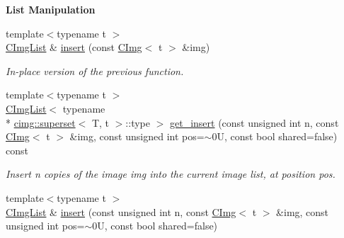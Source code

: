 \begin{Indent}{\bf List Manipulation}
\begin{DoxyCompactItemize}
\item 
\hypertarget{structcimg__library_1_1_c_img_list_a0069f696a8a40633b3472a2dcc4b076a}{{\footnotesize template$<$typename t $>$ }\\\hyperlink{structcimg__library_1_1_c_img_list}{C\-Img\-List} \& \hyperlink{structcimg__library_1_1_c_img_list_a0069f696a8a40633b3472a2dcc4b076a}{insert} (const \hyperlink{structcimg__library_1_1_c_img}{C\-Img}$<$ t $>$ \&img)}\label{structcimg__library_1_1_c_img_list_a0069f696a8a40633b3472a2dcc4b076a}

\begin{DoxyCompactList}\small\item\em In-\/place version of the previous function. \end{DoxyCompactList}\item 
\hypertarget{structcimg__library_1_1_c_img_list_af96d7b414a5c4888aa37aa23daedc517}{{\footnotesize template$<$typename t $>$ }\\\hyperlink{structcimg__library_1_1_c_img_list}{C\-Img\-List}$<$ typename \\*
\hyperlink{structcimg__library_1_1cimg_1_1superset}{cimg\-::superset}$<$ T, t $>$\-::type $>$ \hyperlink{structcimg__library_1_1_c_img_list_af96d7b414a5c4888aa37aa23daedc517}{get\-\_\-insert} (const unsigned int n, const \hyperlink{structcimg__library_1_1_c_img}{C\-Img}$<$ t $>$ \&img, const unsigned int pos=$\sim$0\-U, const bool shared=false) const }\label{structcimg__library_1_1_c_img_list_af96d7b414a5c4888aa37aa23daedc517}

\begin{DoxyCompactList}\small\item\em Insert n copies of the image {\ttfamily img} into the current image list, at position {\ttfamily pos}. \end{DoxyCompactList}\item 
\hypertarget{structcimg__library_1_1_c_img_list_abcd94d9854f3ad236c514304d6738e2e}{{\footnotesize template$<$typename t $>$ }\\\hyperlink{structcimg__library_1_1_c_img_list}{C\-Img\-List} \& \hyperlink{structcimg__library_1_1_c_img_list_abcd94d9854f3ad236c514304d6738e2e}{insert} (const unsigned int n, const \hyperlink{structcimg__library_1_1_c_img}{C\-Img}$<$ t $>$ \&img, const unsigned int pos=$\sim$0\-U, const bool shared=false)}\label{structcimg__library_1_1_c_img_list_abcd94d9854f3ad236c514304d6738e2e}


\end{DoxyCompactItemize}
\end{Indent}
